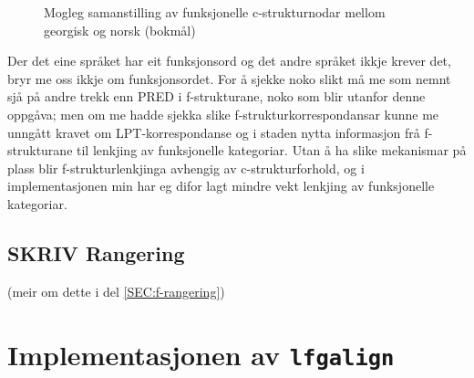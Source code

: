 \documentclass[11pt,a4paper,oneside,draft]{book}
\begin{document}
  \begin{figure}[htp]
   \centering
  
  \caption{Mogleg samanstilling av funksjonelle c-strukturnodar mellom georgisk og norsk (bokmål)}
   \label{fig:fnord}
  \end{figure}

Der det eine språket har eit funksjonsord og det andre språket ikkje
krever det, bryr me oss ikkje om funksjonsordet. For å sjekke noko
slikt må me som nemnt sjå på andre trekk enn PRED i f-strukturane,
noko som blir utanfor denne oppgåva; men om me hadde sjekka slike
f-strukturkorrespondansar kunne me unngått kravet om
LPT-korrespondanse og i staden nytta informasjon frå f-strukturane til
lenkjing av funksjonelle kategoriar. Utan å ha slike mekanismar på
plass blir f-strukturlenkjinga avhengig av c-strukturforhold, og i
implementasjonen min har eg difor lagt mindre vekt lenkjing av
funksjonelle kategoriar.

\section{\textbf{SKRIV} Rangering}
\label{sec-3.8}

(meir om dette i del \ref{SEC:f-rangering})

\chapter{Implementasjonen av \texttt{lfgalign}}
\label{sec-4}

\label{SEC:implementasjon}
\end{document}
